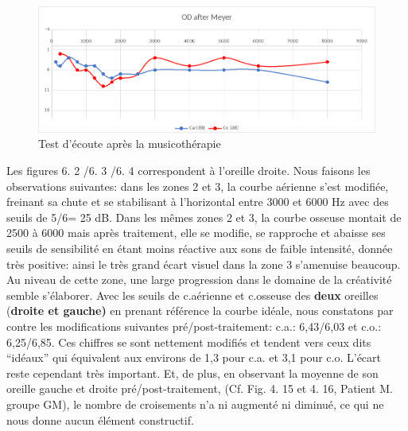              	\begin{figure}[h]
             		\centering

             		\includegraphics[width=1\linewidth]{images/clinique/od_after_meyer.png}
             		\caption{Test d'écoute après la musicothérapie}
             		\label{fig:odaftermeyer}
             	\end{figure}
             Les figures 6. 2 /6. 3 /6. 4 correspondent à l'oreille droite.
                    Nous faisons les observations suivantes:
                  dans les
                    zones 2 et 3,  la courbe aérienne s'est modifiée, freinant sa
                    chute et se stabilisant à l'horizontal entre 3000 et 6000 Hz
                    avec des seuils de 5/6= 25 dB.
                    Dans les mêmes zones 2 et 3, la
                    courbe osseuse montait de 2500 à 6000 mais après traitement,
                    elle se modifie, se rapproche et abaisse ses seuils de
                    sensibilité en étant moins réactive aux sons de faible
                    intensité, donnée très positive: ainsi le très grand écart visuel dans la zone 3 s'amenuise beaucoup. Au niveau de cette
                    zone, une large progression dans
              le domaine de la créativité semble s'élaborer. Avec les
                seuils
                 de c.aérienne et c.osseuse des\textbf{ deux} oreilles (\textbf{droite et gauche)} en prenant
                 référence la courbe idéale, nous
                constatons par contre les modifications suivantes pré/post-traitement:
                c.a.: 6,43/6,03 et c.o.: 6,25/6,85.
                Ces chiffres se sont nettement
                modifiés et tendent vers
                ceux dits ``idéaux''  qui équivalent aux environs de 1,3 pour
                c.a. et 3,1 pour c.o. L'écart reste cependant très important. %
                Et, de plus, en observant la moyenne de son oreille gauche et droite pré/post-traitement,
                (Cf. Fig. 4. 15 et 4. 16, Patient M. groupe GM), le
                nombre de croisements n'a ni augmenté ni diminué, ce qui ne nous donne
                aucun élément constructif.

